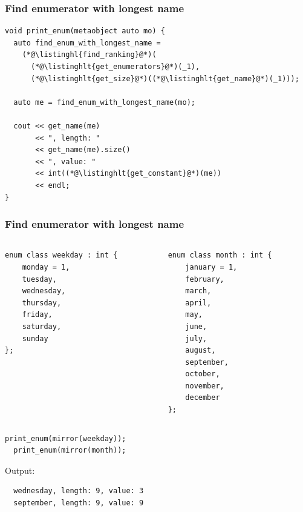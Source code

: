 \documentclass[aspectratio=169,compress,table,xcolor=table]{beamer}
\begin{document}
\begin{frame}[fragile]
  \frametitle{Find enumerator with longest name}
  \begin{lstlisting}[language=c++2x,basicstyle=\footnotesize\ttfamily]
void print_enum(metaobject auto mo) {
  auto find_enum_with_longest_name =
    (*@\listinghl{find_ranking}@*)(
      (*@\listinghlt{get_enumerators}@*)(_1),
      (*@\listinghlt{get_size}@*)((*@\listinghlt{get_name}@*)(_1)));

  auto me = find_enum_with_longest_name(mo);

  cout << get_name(me)
       << ", length: "
       << get_name(me).size()
       << ", value: "
       << int((*@\listinghlt{get_constant}@*)(me))
       << endl;
}
  \end{lstlisting}
\end{frame}
\begin{frame}[fragile]
  \frametitle{Find enumerator with longest name}
  \begin{columns}
    \begin{column}{.45\textwidth}
      \begin{lstlisting}[language=c++2x,basicstyle=\footnotesize\ttfamily]
enum class weekday : int {
    monday = 1,
    tuesday,
    wednesday,
    thursday,
    friday,
    saturday,
    sunday
};
      \end{lstlisting}
    \end{column}
    \begin{column}{.45\textwidth}
      \begin{lstlisting}[language=c++2x,basicstyle=\tiny\ttfamily]
enum class month : int {
    january = 1,
    february,
    march,
    april,
    may,
    june,
    july,
    august,
    september,
    october,
    november,
    december
};
      \end{lstlisting}
    \end{column}
  \end{columns}
  \begin{lstlisting}[language=c++2x]
  print_enum(mirror(weekday));
  print_enum(mirror(month));
  \end{lstlisting}
  Output:
  \begin{verbatim}
  wednesday, length: 9, value: 3
  september, length: 9, value: 9
  \end{verbatim}
\end{frame}
\end{document}
